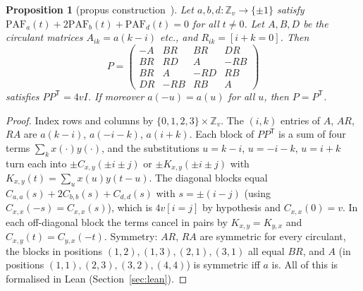 \documentclass[11pt]{article}
\numberwithin{equation}{section}
\newtheorem{proposition}[theorem]{Proposition}
\theoremstyle{definition}
\theoremstyle{remark}
\newcommand{\Z}{\mathbb Z}
\newcommand{\PAF}{\mathrm{PAF}}
\begin{document}
\begin{proposition}[propus construction~\cite{SB17,BDK18}]\label{prop:propus}
Let $a,b,d:\Z_v\to\{\pm1\}$ satisfy $\PAF_a(t)+2\PAF_b(t)+\PAF_d(t)=0$ for all $t\ne0$. Let $A,B,D$ be
the circulant matrices $A_{ik}=a(k-i)$ etc., and $R_{ik}=[i+k=0]$. Then
\[ P=\begin{pmatrix} -A & BR & BR & DR\\ BR & RD & A & -RB\\ BR & A & -RD & RB\\ DR & -RB & RB & A\end{pmatrix} \]
satisfies $PP^{\mathsf T}=4vI$. If moreover $a(-u)=a(u)$ for all $u$, then $P=P^{\mathsf T}$.
\end{proposition}
\begin{proof}
Index rows and columns by $\{0,1,2,3\}\times\Z_v$. The $(i,k)$ entries of $A$, $AR$, $RA$ are $a(k-i)$,
$a(-i-k)$, $a(i+k)$. Each block of $PP^{\mathsf T}$ is a sum of four terms $\sum_k x(\cdot)y(\cdot)$, and the
substitutions $u=k-i$, $u=-i-k$, $u=i+k$ turn each into $\pm C_{x,y}(\pm i\pm j)$ or $\pm K_{x,y}(\pm i\pm j)$
with $K_{x,y}(t)=\sum_u x(u)y(t-u)$. The diagonal blocks equal $C_{a,a}(s)+2C_{b,b}(s)+C_{d,d}(s)$ with
$s=\pm(i-j)$ (using $C_{x,x}(-s)=C_{x,x}(s)$), which is $4v[i=j]$ by hypothesis and $C_{x,x}(0)=v$.
In each off-diagonal block the terms cancel in pairs by $K_{x,y}=K_{y,x}$ and
$C_{x,y}(t)=C_{y,x}(-t)$. Symmetry: $AR$, $RA$ are symmetric for every circulant, the blocks in
positions $(1,2),(1,3),(2,1),(3,1)$ all equal $BR$, and $A$ (in positions $(1,1),(2,3),(3,2),(4,4)$) is
symmetric iff $a$ is. All of this is formalised in Lean (Section~\ref{sec:lean}).
\end{proof}
\end{document}
